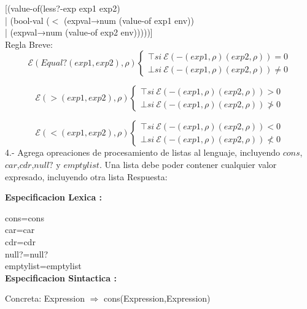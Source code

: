 \documentclass{article}
\begin{document}
[(value-of(less?-exp exp1 exp2)\\
| \hspace{1cm}(bool-val ($<$ (expval→num (value-of exp1 env))\\
| \hspace{1cm}            (expval→num (value-of exp2 env)))))]\\

Regla Breve: \\
$$
\mathcal{E}(Equal?(exp1,exp2),\rho)
\begin{cases}
   \top si \: \mathcal{E}(-(exp1, \rho)(exp2,\rho)) = 0 \\
   \bot si \: \mathcal{E}(-(exp1, \rho)(exp2,\rho)) \not = 0
\end{cases}
$$

$$
\mathcal{E}(>(exp1,exp2),\rho)
\begin{cases}
   \top si \: \mathcal{E}(-(exp1, \rho)(exp2,\rho)) > 0 \\
   \bot si \: \mathcal{E}(-(exp1, \rho)(exp2,\rho)) \not > 0
\end{cases}
$$

$$
\mathcal{E}(<(exp1,exp2),\rho)
\begin{cases}
   \top si \: \mathcal{E}(-(exp1, \rho)(exp2,\rho)) < 0 \\
   \bot si \: \mathcal{E}(-(exp1, \rho)(exp2,\rho)) \not < 0
\end{cases}
$$
4.- Agrega opreaciones de procesamiento de listas al lenguaje, incluyendo $cons$,$car$,$cdr$,$null?$ y $emptylist$. Una lista debe poder contener cualquier valor expresado, incluyendo otra lista
Respuesta: \newline

\textbf{Especificacion Lexica :} \newline

cons=cons\\

car=car\\

cdr=cdr\\

null?=null?\\

emptylist=emptylist\\


\textbf{Especificacion Sintactica :} \newline

Concreta: Expression $\Rightarrow $ cons(Expression,Expression)\\
\end{document}
